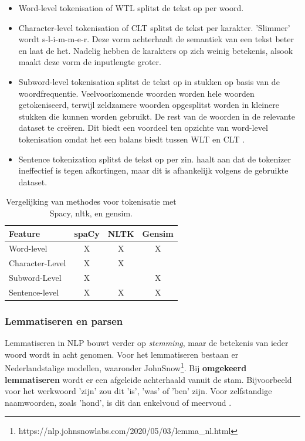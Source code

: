 \begin{itemize}
	\item Word-level tokenisation of WTL splitst de tekst op per woord.
	\item Character-level tokenisation of CLT splitst de tekst per karakter. 'Slimmer' wordt s-l-i-m-m-e-r. Deze vorm achterhaalt de semantiek van een tekst beter en laat de het. Nadelig hebben de karakters op zich weinig betekenis, alsook maakt deze vorm de inputlengte groter. \autocite{Ribeiro2018}
	\item Subword-level tokenisation splitst de tekst op in stukken op basis van de woordfrequentie. Veelvoorkomende woorden worden hele woorden getokeniseerd, terwijl zeldzamere woorden opgesplitst worden in kleinere stukken die kunnen worden gebruikt. De rest van de woorden in de relevante dataset te creëren. Dit biedt een voordeel ten opzichte van word-level tokenisation omdat het een balans biedt tussen WLT en CLT \autocite{Iredale2022}.
	\item Sentence tokenization splitst de tekst op per zin. \textcite{Fardeen2021} haalt aan dat de tokenizer ineffectief is tegen afkortingen, maar dit is afhankelijk volgens de gebruikte dataset. 
\end{itemize}

\begin{table}[h!]
	\centering
	\begin{tabular}{|l|c|c|c|}
		\hline
		Feature & spaCy & NLTK & Gensim \\
		\hline
		Word-level & X & X & X \\
		Character-Level & X & X &  \\
		Subword-Level & X &  & X \\
		Sentence-level & X & X & X \\
		\hline
	\end{tabular}
	\caption{Vergelijking van methodes voor tokenisatie met Spacy, nltk, en gensim.}
	\label{tab:nlp-features}
\end{table}

\subsubsection{Lemmatiseren en parsen}

Lemmatiseren in NLP bouwt verder op \textit{stemming}, maar de betekenis van ieder woord wordt in acht genomen. Voor het lemmatiseren bestaan er Nederlandstalige modellen, waaronder JohnSnow\footnote{https://nlp.johnsnowlabs.com/2020/05/03/lemma\_nl.html}. Bij \textbf{omgekeerd lemmatiseren} wordt er een afgeleide achterhaald vanuit de stam. Bijvoorbeeld voor het werkwoord 'zijn' zou dit 'is', 'was' of 'ben' zijn. Voor zelfstandige naamwoorden, zoals 'hond', is dit dan enkelvoud of meervoud \autocite{Eisenstein2019}.

